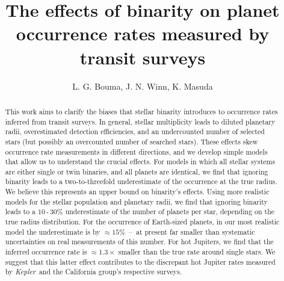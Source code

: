 \documentclass[12pt,modern]{aastex61}
\begin{document}
    
\title{ The effects of binarity on planet occurrence rates measured by transit 
surveys}

\author{
L. G. Bouma, J. N. Winn, K. Masuda
}

\begin{abstract}

This work aims to clarify the biases that stellar binarity introduces
to occurrence rates inferred from transit surveys.
In general, stellar multiplicity leads to diluted planetary 
radii, overestimated detection efficiencies, and an undercounted number of 
selected stars (but possibly an overcounted number of searched stars).
These effects skew occurrence rate measurements in different directions, and 
we develop simple models that allow us to understand the crucial effects.
For models in which all stellar systems are either single or twin binaries, 
and all planets are identical, we find that ignoring binarity leads to a
two-to-threefold underestimate of the occurrence at the true radius.
We believe this represents an upper bound on binarity's effects.
Using more realistic models for the stellar population and planetary 
radii, we find that ignoring binarity leads to a $10$\,-\,$30\%$ 
underestimate of the number of planets per star, depending on the true radius 
distribution.
For the occurrence of Earth-sized planets, in our most realistic model the 
underestimate is by $\approx 15\%$~--~at present far smaller than 
systematic uncertainties on real measurements of this number.
For hot Jupiters, we find that the inferred occurrence rate is 
$\approx 1.3\times$ smaller than the true rate around single stars.
We suggest that this latter effect contributes to the discrepant hot Jupiter 
rates measured by {\it Kepler}\ and the California group's respective surveys.
\end{abstract}











\end{document}
